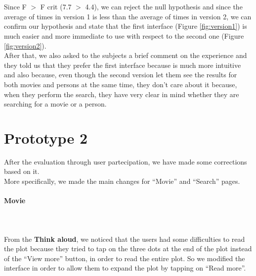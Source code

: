 \documentclass[12pt, a4paper]{article}
\numberwithin{figure}{section}
\begin{document}
\noindent\mbox{}\\\\
Since F $>$ F crit (7.7 $>$ 4.4), we can reject the null hypothesis and since the average of times in version 1 is less than
the average of times in version 2, we can confirm our hypothesis and state that the first interface (Figure \ref{fig:version1})
is much easier and more immediate to use with respect to the second one (Figure \ref{fig:version2}).\\
After that, we also asked to the subjects a brief comment on the experience and they told us
that they prefer the first interface because is much more intuitive and also because, even though the
second version let them see the results for both movies and persons at the same time, they don't care
about it because, when they perform the search, they have very clear in  mind whether they are searching
for a movie or a person.



\newpage

\section{Prototype 2}

After the evaluation through user partecipation, we have made some corrections based on it.\\
More specifically, we made the main changes for “Movie” and “Search” pages.

\paragraph{Movie}\mbox{}\\\\
From the \textbf{Think aloud}, we noticed that the users had some difficulties to read the plot because
they tried to tap on the three dots at the end of the plot instead of the “View more” button,
in order to read the entire plot. So we modified the interface in order to allow them to expand the
plot by tapping on “Read more”.
\end{document}
